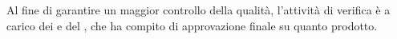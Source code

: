 Al fine di garantire un maggior controllo della qualità, l'attività di verifica è a carico dei \vers \space e del \Res , che ha compito di approvazione finale su quanto prodotto.